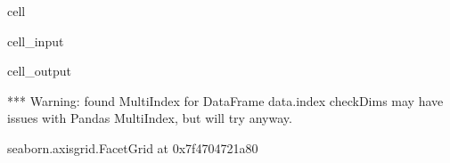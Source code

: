 \documentclass[letterpaper,table,10pt,english]{jupyterBook}
\begin{document}
\begin{sphinxuseclass}{cell}\begin{sphinxVerbatimInput}

\begin{sphinxuseclass}{cell_input}
\begin{sphinxVerbatim}[commandchars=\\\{\}]
  
     
                 
                     
\end{sphinxVerbatim}

\end{sphinxuseclass}\end{sphinxVerbatimInput}
\begin{sphinxVerbatimOutput}

\begin{sphinxuseclass}{cell_output}
\begin{sphinxVerbatim}[commandchars=\\\{\}]
*** Warning: found MultiIndex for DataFrame data.index \PYGZhy{} checkDims may have issues with Pandas MultiIndex, but will try anyway.
\end{sphinxVerbatim}

\begin{sphinxVerbatim}[commandchars=\\\{\}]
\PYGZlt{}seaborn.axisgrid.FacetGrid at 0x7f4704721a80\PYGZgt{}
\end{sphinxVerbatim}

\noindent{}

\end{sphinxuseclass}\end{sphinxVerbatimOutput}

\end{sphinxuseclass}
\end{document}
